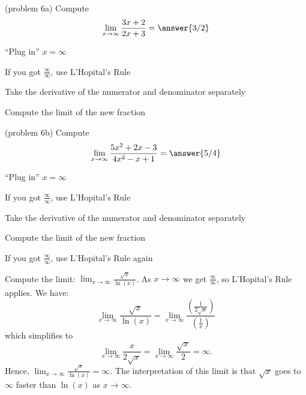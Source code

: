\documentclass{ximera}
\begin{document}
\begin{problem}(problem 6a)
  Compute
  \[
  \lim_{x \to \infty} \frac{3x+2}{2x + 3} = \answer{3/2}
  \]
  
    \begin{hint}
      ``Plug in'' $x=\infty$
    \end{hint}
    \begin{hint}
      If you got $\frac{\infty}{\infty}$, use L'Hopital's Rule
    \end{hint}
    \begin{hint}
      Take the derivative of the numerator and denominator separately
    \end{hint}
		\begin{hint}
      Compute the limit of the new fraction
    \end{hint}
	
\end{problem}


\begin{problem}(problem 6b)
  Compute
  \[
  \lim_{x \to \infty} \frac{5x^2 + 2x - 3}{4x^2 - x + 1} = \answer{5/4}
  \]
  
    \begin{hint}
      ``Plug in'' $x=\infty$
    \end{hint}
    \begin{hint}
      If you got $\frac{\infty}{\infty}$, use L'Hopital's Rule
    \end{hint}
    \begin{hint}
      Take the derivative of the numerator and denominator separately
    \end{hint}
		\begin{hint}
      Compute the limit of the new fraction
    \end{hint}
		\begin{hint}
		  If you got $\frac{\infty}{\infty}$, use L'Hopital's Rule again
	  \end{hint}
		
\end{problem}


\begin{example}[example 7]
Compute the limit: \quad $\displaystyle{\lim_{x \to \infty} \frac{\sqrt{x}}{\ln(x)}}$.
As $x \to \infty$ we get $\frac{\infty}{\infty}$, so L'Hopital's Rule applies.
We have:
\[\lim_{x \to \infty} \frac{\sqrt x}{\ln(x)} = 
\lim_{x \to \infty}\frac{\left(\frac{1}{2\sqrt x}\right)}{\left(\frac{1}{x}\right)}\]
which simplifies to 
\[\lim_{x\to\infty} \frac{x}{2\sqrt x} = \lim_{x\to\infty}\frac{\sqrt x}{2} = \infty.\]
Hence, $\lim_{x\to\infty} \frac{\sqrt x}{\ln(x)} = \infty$.
The interpretation of this limit is that $\sqrt x$ goes to $\infty$ faster than $\ln(x)$ as $x\to\infty$.
\end{example}
\end{document}
